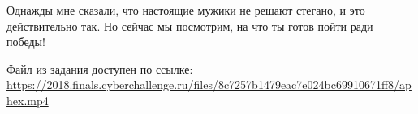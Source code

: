 
Однажды мне сказали, что настоящие мужики не решают стегано, и это действительно так. Но сейчас мы посмотрим, на что ты готов пойти ради победы!

Файл из задания доступен по ссылке: \url{https://2018.finals.cyberchallenge.ru/files/8c7257b1479eac7e024bc69910671ff8/aphex.mp4}
 
